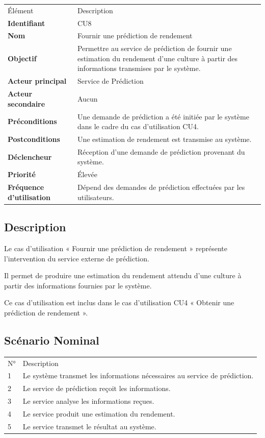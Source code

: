 \documentclass[
]{book}
\begin{document}
\begin{longtable}[]{@{}ll@{}}
\toprule
\endhead
Élément & Description \\
\textbf{Identifiant} & CU8 \\
\textbf{Nom} & Fournir une prédiction de rendement \\
\textbf{Objectif} & Permettre au service de prédiction de fournir une
estimation du rendement d'une culture à partir des informations
transmises par le système. \\
\textbf{Acteur principal} & Service de Prédiction \\
\textbf{Acteur secondaire} & Aucun \\
\textbf{Préconditions} & Une demande de prédiction a été initiée par le
système dans le cadre du cas d'utilisation CU4. \\
\textbf{Postconditions} & Une estimation de rendement est transmise au
système. \\
\textbf{Déclencheur} & Réception d'une demande de prédiction provenant
du système. \\
\textbf{Priorité} & Élevée \\
\textbf{Fréquence d'utilisation} & Dépend des demandes de prédiction
effectuées par les utilisateurs. \\
\bottomrule
\end{longtable}

\hypertarget{description-6}{%
\subsection{Description}\label{description-6}}

Le cas d'utilisation « Fournir une prédiction de rendement » représente
l'intervention du service externe de prédiction.

Il permet de produire une estimation du rendement attendu d'une culture
à partir des informations fournies par le système.

Ce cas d'utilisation est inclus dans le cas d'utilisation CU4 « Obtenir
une prédiction de rendement ».

\hypertarget{scuxe9nario-nominal-7}{%
\subsection{Scénario Nominal}\label{scuxe9nario-nominal-7}}

\begin{longtable}[]{@{}ll@{}}
\toprule
\endhead
N° & Description \\
1 & Le système transmet les informations nécessaires au service de
prédiction. \\
2 & Le service de prédiction reçoit les informations. \\
3 & Le service analyse les informations reçues. \\
4 & Le service produit une estimation du rendement. \\
5 & Le service transmet le résultat au système. \\
\bottomrule
\end{longtable}
\end{document}

